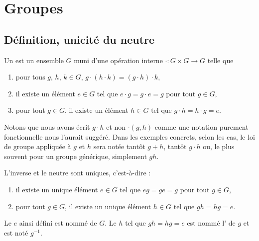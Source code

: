 \section{Groupes}

\subsection{Définition, unicité du neutre}

\begin{definition}[Groupe]      \label{DEFooBMUZooLAfbeM}
    Un  est un ensemble \( G\) muni d'une opération interne \( \cdot\colon G\times G\to G\) telle que
    \begin{enumerate}
        \item
            pour tous \( g\), \( h\), \( k\in G\), \( g\cdot(h\cdot k)=(g\cdot h)\cdot k\),
        \item
            il existe un élément \( e\in G\) tel que \( e\cdot g=g\cdot e=g\) pour tout \( g\in G\),
        \item
            pour tout \( g\in G\), il existe un élément \( h\in  G\) tel que \(g\cdot h=h\cdot g=e \).
    \end{enumerate}
\end{definition}

    Notons que nous avons écrit \( g\cdot h\) et non \( \cdot(g,h)\) comme une notation purement fonctionnelle nous l'aurait suggéré. Dans les exemples concrets, selon les cas, le loi de groupe appliquée à \( g\) et \( h\) sera notée tantôt \( g+h\), tantôt \( g\cdot h\) ou, le plus souvent pour un groupe générique, simplement \( gh\).

\begin{lemmaDef}[Unicités]  \label{LEMooECDMooCkWxXf}
    L'inverse et le neutre sont uniques, c'est-à-dire :
    \begin{enumerate}
        \item
            il existe un unique élément \( e\in G\) tel que \( e g=g e=g\) pour tout \( g\in G\),
        \item       \label{ITEMooOIWTooYqmMPP}
            pour tout \( g\in G\), il existe un unique élément \( h\in  G\) tel que \(g h=h g=e \).
    \end{enumerate}
    Le \( e\) ainsi défini est nommé  de \( G\). Le \( h\) tel que \( g h=h g=e\) est nommé l' de \( g\) et est noté \( g^{-1}\).
\end{lemmaDef}

